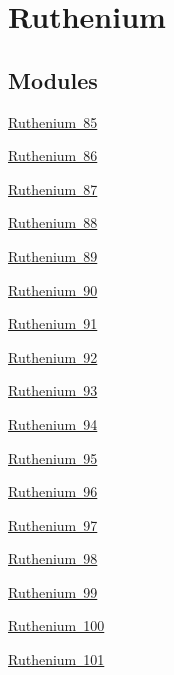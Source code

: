 \hypertarget{group___isotope_const-_ruthenium}{}\section{Ruthenium}
\label{group___isotope_const-_ruthenium}
\subsection*{Modules}
\begin{DoxyCompactItemize}
\item 
\mbox{\hyperlink{group___isotope_const-_ruthenium-_ru85}{Ruthenium 85}}
\item 
\mbox{\hyperlink{group___isotope_const-_ruthenium-_ru86}{Ruthenium 86}}
\item 
\mbox{\hyperlink{group___isotope_const-_ruthenium-_ru87}{Ruthenium 87}}
\item 
\mbox{\hyperlink{group___isotope_const-_ruthenium-_ru88}{Ruthenium 88}}
\item 
\mbox{\hyperlink{group___isotope_const-_ruthenium-_ru89}{Ruthenium 89}}
\item 
\mbox{\hyperlink{group___isotope_const-_ruthenium-_ru90}{Ruthenium 90}}
\item 
\mbox{\hyperlink{group___isotope_const-_ruthenium-_ru91}{Ruthenium 91}}
\item 
\mbox{\hyperlink{group___isotope_const-_ruthenium-_ru92}{Ruthenium 92}}
\item 
\mbox{\hyperlink{group___isotope_const-_ruthenium-_ru93}{Ruthenium 93}}
\item 
\mbox{\hyperlink{group___isotope_const-_ruthenium-_ru94}{Ruthenium 94}}
\item 
\mbox{\hyperlink{group___isotope_const-_ruthenium-_ru95}{Ruthenium 95}}
\item 
\mbox{\hyperlink{group___isotope_const-_ruthenium-_ru96}{Ruthenium 96}}
\item 
\mbox{\hyperlink{group___isotope_const-_ruthenium-_ru97}{Ruthenium 97}}
\item 
\mbox{\hyperlink{group___isotope_const-_ruthenium-_ru98}{Ruthenium 98}}
\item 
\mbox{\hyperlink{group___isotope_const-_ruthenium-_ru99}{Ruthenium 99}}
\item 
\mbox{\hyperlink{group___isotope_const-_ruthenium-_ru100}{Ruthenium 100}}
\item 
\mbox{\hyperlink{group___isotope_const-_ruthenium-_ru101}{Ruthenium 101}}
\item 

\end{DoxyCompactItemize}
